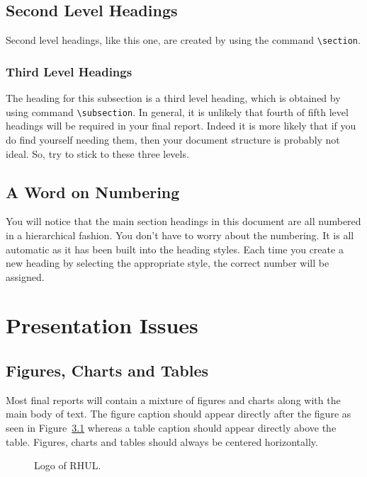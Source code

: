 \documentclass[]{final_report}
\begin{document}
\section{Second Level Headings}
Second level headings, like this one, are created by using the command \verb|\section|.
\subsection{Third Level Headings}
The heading for this subsection is a third level heading, which is obtained by using command \verb|\subsection|. In general, it is unlikely that fourth of fifth level headings will be required in your final report. Indeed it is more likely that if you do find yourself needing them, then your document structure is probably not ideal. So, try to stick to these three levels.
\section{A Word on Numbering}
You will notice that the main section headings in this document are all numbered in a hierarchical fashion. You don't have to worry about the numbering. It is all automatic as it has been built into the heading styles. Each time you create a new heading by selecting the appropriate style, the correct number will be assigned. 


\chapter{Presentation Issues}

\section{Figures, Charts and Tables}

Most final reports will contain a mixture of figures and charts along with the main body of text. The figure caption should appear directly after the figure as seen in Figure~\ref{fig:logo} whereas a table caption should appear directly above the table. Figures, charts and tables should always be centered horizontally. 

\begin{figure}[h]
\centering
\fboxsep 2mm
\caption{\label{fig:logo} Logo of RHUL.}
\end{figure} 
\end{document}
